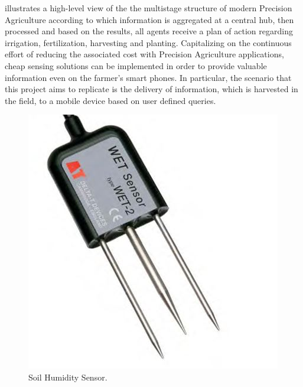 \documentclass{article}
\begin{document}
\noindent illustrates a high-level view of the the multistage structure of modern Precision Agriculture according to which information is aggregated at a central hub, then processed and based on the results, all agents receive a plan of action regarding irrigation, fertilization, harvesting and planting.  Capitalizing on the continuous effort of reducing the associated cost with Precision Agriculture applications, cheap sensing solutions can be implemented in order to provide valuable information even on the farmer's smart phones. In particular, the scenario that this project aims to replicate is the delivery of information, which is harvested in the field, to a mobile device based on user defined queries. 
\begin{figure}
\begin{center}
   \includegraphics[width=1\linewidth,trim={0 0 0 0cm},clip]{Images/HumSens.jpg}
\end{center}
\vspace{-0.2in}
   \caption{\footnotesize{Soil Humidity Sensor.}}
   \label{fig:Humsens}
\end{figure}
\end{document}
